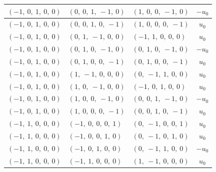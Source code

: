 \documentclass[11pt]{article}
\theoremstyle{definition}
\begin{document}
\begin{longtable}{|l|l|l|c|}
    \hline
    $\left( -1, \  0, \  1, \  0, \  0\right)$ & $\left( 0, \  0, \  1, \  -1, \  0\right)$ & $\left( 1, \  0, \  0, \  -1, \  0\right)$ & $- u_{0}$ \\
    \hline
    $\left( -1, \  0, \  1, \  0, \  0\right)$ & $\left( 0, \  0, \  1, \  0, \  -1\right)$ & $\left( 1, \  0, \  0, \  0, \  -1\right)$ & $u_{0}$ \\
    \hline
    $\left( -1, \  0, \  1, \  0, \  0\right)$ & $\left( 0, \  1, \  -1, \  0, \  0\right)$ & $\left( -1, \  1, \  0, \  0, \  0\right)$ & $u_{0}$ \\
    \hline
    $\left( -1, \  0, \  1, \  0, \  0\right)$ & $\left( 0, \  1, \  0, \  -1, \  0\right)$ & $\left( 0, \  1, \  0, \  -1, \  0\right)$ & $- u_{0}$ \\
    \hline
    $\left( -1, \  0, \  1, \  0, \  0\right)$ & $\left( 0, \  1, \  0, \  0, \  -1\right)$ & $\left( 0, \  1, \  0, \  0, \  -1\right)$ & $u_{0}$ \\
    \hline
    $\left( -1, \  0, \  1, \  0, \  0\right)$ & $\left( 1, \  -1, \  0, \  0, \  0\right)$ & $\left( 0, \  -1, \  1, \  0, \  0\right)$ & $u_{0}$ \\
    \hline
    $\left( -1, \  0, \  1, \  0, \  0\right)$ & $\left( 1, \  0, \  -1, \  0, \  0\right)$ & $\left( -1, \  0, \  1, \  0, \  0\right)$ & $u_{0}$ \\
    \hline
    $\left( -1, \  0, \  1, \  0, \  0\right)$ & $\left( 1, \  0, \  0, \  -1, \  0\right)$ & $\left( 0, \  0, \  1, \  -1, \  0\right)$ & $- u_{0}$ \\
    \hline
    $\left( -1, \  0, \  1, \  0, \  0\right)$ & $\left( 1, \  0, \  0, \  0, \  -1\right)$ & $\left( 0, \  0, \  1, \  0, \  -1\right)$ & $u_{0}$ \\
    \hline
    $\left( -1, \  1, \  0, \  0, \  0\right)$ & $\left( -1, \  0, \  0, \  0, \  1\right)$ & $\left( 0, \  -1, \  0, \  0, \  1\right)$ & $u_{0}$ \\
    \hline
    $\left( -1, \  1, \  0, \  0, \  0\right)$ & $\left( -1, \  0, \  0, \  1, \  0\right)$ & $\left( 0, \  -1, \  0, \  1, \  0\right)$ & $u_{0}$ \\
    \hline
    $\left( -1, \  1, \  0, \  0, \  0\right)$ & $\left( -1, \  0, \  1, \  0, \  0\right)$ & $\left( 0, \  -1, \  1, \  0, \  0\right)$ & $- u_{0}$ \\
    \hline
    $\left( -1, \  1, \  0, \  0, \  0\right)$ & $\left( -1, \  1, \  0, \  0, \  0\right)$ & $\left( 1, \  -1, \  0, \  0, \  0\right)$ & $u_{0}$ \\

\end{longtable}
\end{document}
